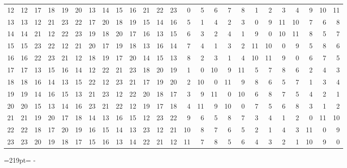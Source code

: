 \documentclass[10pt,a4paper]{article}
\newcommand{\needspace}[1]{\par\penalty-100\begingroup\dimen0=#1\relax\dimen2=\pagegoal
  \advance\dimen2-\pagetotal\ifdim\dimen0>\dimen2\relax\ifdim\dimen2>0pt\vfil\break\fi\fi
  \endgroup}
\numberwithin{equation}{section}
\begin{document}
{\begin{longtable}{@{}r|rrrrrrrrrrrrrrrrrrrrrrrr@{}}
12 & 12 & 17 & 18 & 19 & 20 & 13 & 14 & 15 & 16 & 21 & 22 & 23 & 0 & 5 & 6 & 7 & 8 & 1 & 2 & 3 & 4 & 9 & 10 & 11\\
13 & 13 & 12 & 21 & 23 & 22 & 17 & 20 & 18 & 19 & 15 & 14 & 16 & 5 & 1 & 4 & 2 & 3 & 0 & 9 & 11 & 10 & 7 & 6 & 8\\
14 & 14 & 21 & 12 & 22 & 23 & 19 & 18 & 20 & 17 & 16 & 13 & 15 & 6 & 3 & 2 & 4 & 1 & 9 & 0 & 10 & 11 & 8 & 5 & 7\\
15 & 15 & 23 & 22 & 12 & 21 & 20 & 17 & 19 & 18 & 13 & 16 & 14 & 7 & 4 & 1 & 3 & 2 & 11 & 10 & 0 & 9 & 5 & 8 & 6\\
16 & 16 & 22 & 23 & 21 & 12 & 18 & 19 & 17 & 20 & 14 & 15 & 13 & 8 & 2 & 3 & 1 & 4 & 10 & 11 & 9 & 0 & 6 & 7 & 5\\
17 & 17 & 13 & 15 & 16 & 14 & 12 & 22 & 21 & 23 & 18 & 20 & 19 & 1 & 0 & 10 & 9 & 11 & 5 & 7 & 8 & 6 & 2 & 4 & 3\\
18 & 18 & 16 & 14 & 13 & 15 & 22 & 12 & 23 & 21 & 17 & 19 & 20 & 2 & 10 & 0 & 11 & 9 & 8 & 6 & 5 & 7 & 1 & 3 & 4\\
19 & 19 & 14 & 16 & 15 & 13 & 21 & 23 & 12 & 22 & 20 & 18 & 17 & 3 & 9 & 11 & 0 & 10 & 6 & 8 & 7 & 5 & 4 & 2 & 1\\
20 & 20 & 15 & 13 & 14 & 16 & 23 & 21 & 22 & 12 & 19 & 17 & 18 & 4 & 11 & 9 & 10 & 0 & 7 & 5 & 6 & 8 & 3 & 1 & 2\\
21 & 21 & 19 & 20 & 17 & 18 & 14 & 13 & 16 & 15 & 12 & 23 & 22 & 9 & 6 & 5 & 8 & 7 & 3 & 4 & 1 & 2 & 0 & 11 & 10\\
22 & 22 & 18 & 17 & 20 & 19 & 16 & 15 & 14 & 13 & 23 & 12 & 21 & 10 & 8 & 7 & 6 & 5 & 2 & 1 & 4 & 3 & 11 & 0 & 9\\*
23 & 23 & 20 & 19 & 18 & 17 & 15 & 16 & 13 & 14 & 22 & 21 & 12 & 11 & 7 & 8 & 5 & 6 & 4 & 3 & 2 & 1 & 10 & 9 & 0\\
\bottomrule\end{longtable}}
\needspace{219pt}
\end{document}
